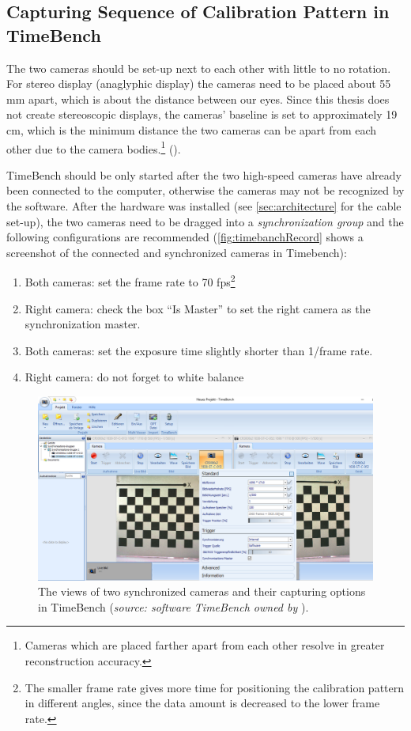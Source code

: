 \subsection{Capturing Sequence of Calibration Pattern in TimeBench}\label{ssec:PatternSequence}
The two cameras should be set-up next to each other with little to no rotation. For stereo display (anaglyphic display) the cameras need to be placed about 55 mm apart, which is about the distance between our eyes. Since this thesis does not create stereoscopic displays, the cameras' baseline is set to approximately 19 cm, which is the minimum distance the two cameras can be apart from each other due to the camera bodies.\footnote{Cameras which are placed farther apart from each other resolve in greater reconstruction accuracy.} (\cite{StereoCalib.2016}).  

TimeBench should be only started after the two high-speed cameras have already been connected to the computer, otherwise the cameras may not be recognized by the software. After the hardware was installed (see \autoref{sec:architecture} for the cable set-up), the two cameras need to be dragged into a \textit{synchronization group} and the following configurations are recommended (\autoref{fig:timebanchRecord} shows a screenshot of the connected and synchronized cameras in Timebench): 

\begin{enumerate}[i]
\item Both cameras: set the frame rate to 70 fps\footnote{The smaller frame rate gives more time for positioning the calibration pattern in different angles, since the data amount is decreased to the lower frame rate.}
\item Right camera: check the box \enquote{Is Master} to set the right camera as the synchronization master.
\item Both cameras: set the exposure time slightly shorter than 1/frame rate.
\item Right camera: do not forget to white balance 
\end{enumerate}

\begin{figure}[htbp]
		\centering
		\includegraphics[width=1.0\textwidth]{figures/timebenchRecord}
		\caption[The views of two synchronized cameras and their capturing options in TimeBench]{The views of two synchronized cameras and their capturing options in TimeBench (\textit{source: software TimeBench owned by} \cite{Optronis.2016}).}
		\label{fig:timebanchRecord}
\end{figure}

